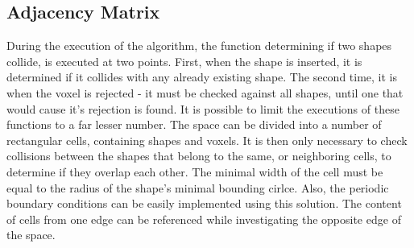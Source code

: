 \documentclass[12pt, oneside]{report}
\begin{document}
\subsection{Adjacency Matrix}

During the execution of the algorithm, the function determining if two shapes collide, is executed at two points. First, when the shape is inserted, it is determined if it collides with any already existing shape. The second time, it is when the voxel is rejected - it must be checked against all shapes, until one that would cause it's rejection is found. \newline
It is possible to limit the executions of these functions to a far lesser number. The space can be divided into a number of rectangular cells, containing shapes and voxels. It is then only necessary to check collisions between the shapes that belong to the same, or neighboring cells, to determine if they overlap each other. The minimal width of the cell must be equal to the radius of the shape's minimal bounding cirlce. \newline
Also, the periodic boundary conditions can be easily implemented using this solution. The content of cells from one edge can be referenced while investigating the opposite edge of the space.
\end{document}
